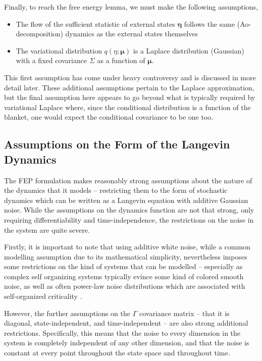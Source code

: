 Finally, to reach the free energy lemma, we must make the following assumptions,
\begin{itemize}
  \item The flow of the sufficient statistic of external states $\bm{\eta}$ follows the same (Ao-decomposition) dynamics as the external states themselves
  \item The variational distribution $q(\eta;\bm{\mu})$ is a Laplace distribution (Gaussian) with a fixed covariance $\Sigma$ as a function of $\bm{\mu}$.
\end{itemize}
This first assumption has come under heavy controversy and is discussed in more detail later. These additional assumptions pertain to the Laplace approximation, but the final assumption here appears to go beyond what is typically required by variational Laplace where, since the conditional distribution is a function of the blanket, one would expect the conditional covariance to be one too.

\subsection{Assumptions on the Form of the Langevin Dynamics}

The FEP formulation makes reasonably strong assumptions about the nature of the dynamics that it models -- restricting them to the form of stochastic dynamics which can be written as a Langevin equation with additive Gaussian noise. While the assumptions on the dynamics function are not that strong, only requiring differentiability and time-independence, the restrictions on the noise in the system are quite severe.

Firstly, it is important to note that using additive white noise, while a common modelling assumption due to its mathematical simplicity, nevertheless imposes some restrictions on the kind of systems that can be modelled -- especially as complex self organizing systems typically evince some kind of colored smooth noise, as well as often power-law noise distributions which are associated with self-organized criticality \citep{ovchinnikov2016introduction}.

However, the further assumptions on the $\Gamma$ covariance matrix -- that it is diagonal, state-independent, and time-independent -- are also strong additional restrictions. Specifically, this means that the noise to every dimension in the system is completely independent of any other dimension, and that the noise is constant at every point throughout the state space and throughout time.
